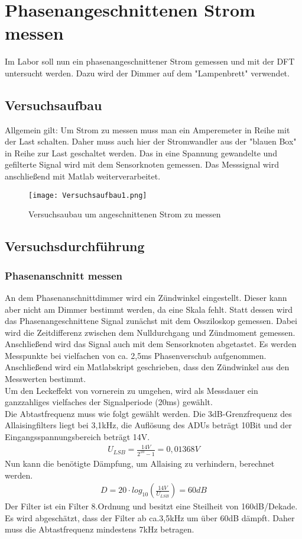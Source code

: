 \documentclass{article}%
\begin{document}
\section{Phasenangeschnittenen Strom messen}
Im Labor soll nun ein phasenangeschnittener Strom gemessen und mit der DFT untersucht werden.
Dazu wird der Dimmer auf dem "Lampenbrett" verwendet.
\subsection{Versuchsaufbau}
Allgemein gilt: Um Strom zu messen muss man ein Amperemeter in Reihe mit der Last schalten. Daher muss auch hier der Stromwandler aus der "blauen Box" in Reihe zur Last geschaltet werden. Das in eine Spannung gewandelte und gefilterte Signal wird mit dem Sensorknoten gemessen. Das Messsignal wird anschließend mit Matlab weiterverarbeitet.
\begin{figure}[htb]
\centering
\texttt{[image: Versuchsaufbau1.png]}
\caption{Versuchsaubau um angeschnittenen Strom zu messen}
\end{figure}
\subsection{Versuchsdurchführung}
\subsubsection{Phasenanschnitt messen}
An dem Phasenanschnittdimmer wird ein Zündwinkel eingestellt. Dieser kann aber nicht am Dimmer bestimmt werden, da eine Skala fehlt. Statt dessen wird das Phasenangeschnittene Signal zunächst mit dem Ossziloskop gemessen. Dabei wird die Zeitdifferenz zwischen dem Nulldurchgang und Zündmoment gemessen. Anschließend wird das Signal auch mit dem Sensorknoten abgetastet.
Es werden Messpunkte bei vielfachen von ca. 2,5ms Phasenverschub aufgenommen. Anschließend wird ein Matlabskript geschrieben, dass den Zündwinkel aus den Messwerten bestimmt.\\ Um den Leckeffekt von vornerein zu umgehen, wird als Messdauer ein ganzzahliges vielfaches der Signalperiode (20ms) gewählt.\\ Die Abtastfrequenz muss wie folgt gewählt werden. Die 3dB-Grenzfrequenz des Allaisingfilters liegt bei 3,1kHz, die Auflösung des ADUs beträgt 10Bit und der Eingangsspannungsbereich beträgt 14V.\\
\begin{align}
U_{LSB} = \frac{14V}{2^{10}-1} = 0,01368V 
\end{align} 
Nun kann die benötigte Dämpfung, um Allaising zu verhindern, berechnet werden.\\
\begin{align}
D = 20 \cdot log_{10}(\frac{14V}{U_{LSB}}) = 60dB
\end{align} 
Der Filter ist ein Filter 8.Ordnung und besitzt eine Steilheit von 160dB/Dekade. Es wird abgeschätzt, dass der Filter ab ca.3,5kHz um über 60dB dämpft. Daher muss die Abtastfrequenz mindestens 7kHz betragen.
\end{document}
